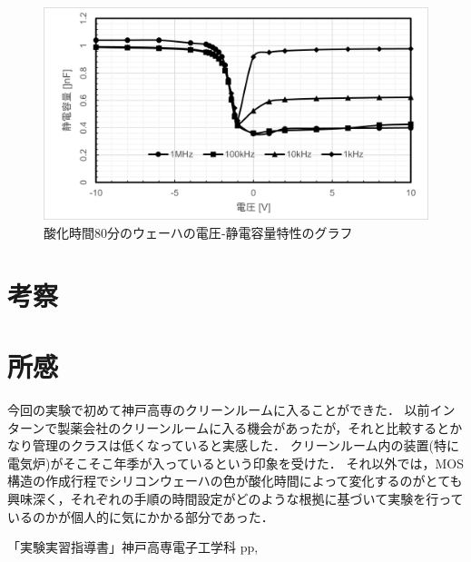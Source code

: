 \documentclass[11pt]{jarticle}
\begin{document}
			\begin{figure}[H]
			\centering
			\includegraphics[width = 12cm]{figs/wehacap80.png}
			\caption{酸化時間80分のウェーハの電圧‐静電容量特性のグラフ}
			\label{fig:wehacap80}
			\end{figure}

\section{考察}
\section{所感}
	今回の実験で初めて神戸高専のクリーンルームに入ることができた．
	以前インターンで製薬会社のクリーンルームに入る機会があったが，それと比較するとかなり管理のクラスは低くなっていると実感した．
	クリーンルーム内の装置(特に電気炉)がそこそこ年季が入っているという印象を受けた．
	それ以外では，MOS構造の作成行程でシリコンウェーハの色が酸化時間によって変化するのがとても興味深く，それぞれの手順の時間設定がどのような根拠に基づいて実験を行っているのかが個人的に気にかかる部分であった．
\begin{thebibliography}{99}
「実験実習指導書」神戸高専電子工学科 pp,
\end{thebibliography}
\end{document}
